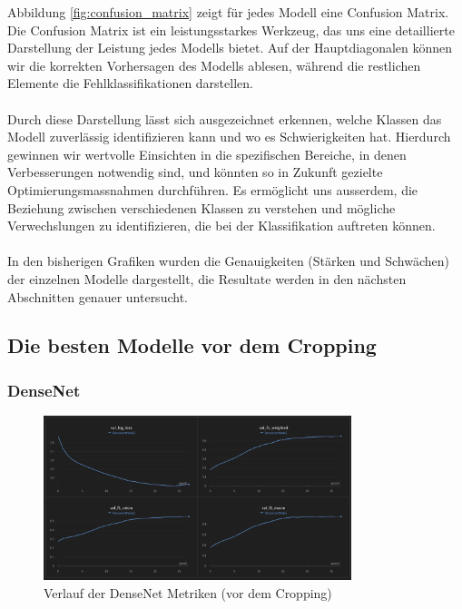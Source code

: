\documentclass{article}
\begin{document}
Abbildung \ref{fig:confusion_matrix} zeigt für jedes Modell eine Confusion Matrix. Die Confusion Matrix ist ein leistungsstarkes Werkzeug, das uns eine detaillierte Darstellung der Leistung jedes Modells bietet. Auf der Hauptdiagonalen können wir die korrekten Vorhersagen des Modells ablesen, während die restlichen Elemente die Fehlklassifikationen darstellen.\\\\
Durch diese Darstellung lässt sich ausgezeichnet erkennen, welche Klassen das Modell zuverlässig identifizieren kann und wo es Schwierigkeiten hat. Hierdurch gewinnen wir wertvolle Einsichten in die spezifischen Bereiche, in denen Verbesserungen notwendig sind, und könnten so in Zukunft gezielte Optimierungsmassnahmen durchführen. Es ermöglicht uns ausserdem, die Beziehung zwischen verschiedenen Klassen zu verstehen und mögliche Verwechslungen zu identifizieren, die bei der Klassifikation auftreten können.\\\\
In den bisherigen Grafiken wurden die Genauigkeiten (Stärken und Schwächen) der einzelnen Modelle dargestellt, die Resultate werden in den nächsten Abschnitten genauer untersucht.

\subsection{Die besten Modelle vor dem Cropping}

\subsubsection{DenseNet}

\begin{figure}[!h]
    \centering
    \includegraphics[width=0.8\textwidth]{plots/DenseNet_wandb_before_cropping.png}
    \caption{\label{fig:wb_densenet_before_cropping}Verlauf der DenseNet Metriken (vor dem Cropping)}
\end{figure}
\end{document}
